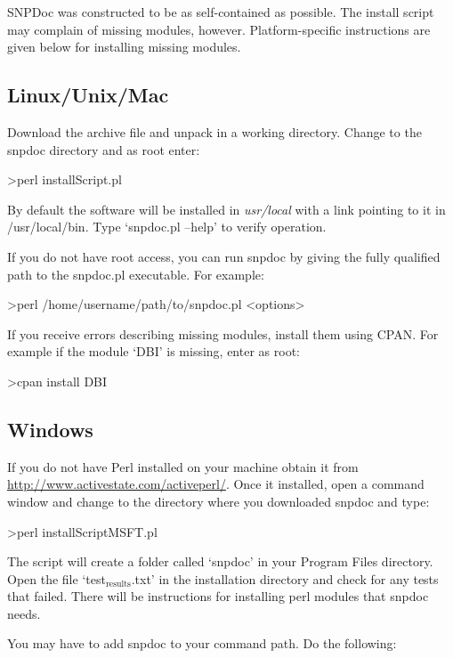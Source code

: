 \documentclass[11pt]{article}
\begin{document}
  SNPDoc was constructed to be as self-contained as possible.  The install
  script may complain of missing modules, however.  Platform-specific
  instructions are given below for installing missing modules.
\subsection{Linux/Unix/Mac}
\label{sec-2_1}


   Download the archive file and unpack in a working directory.  Change to the
   snpdoc directory and as root enter:

   >perl installScript.pl

   By default the software will be installed in \emph{usr/local} with a link pointing
   to it in /usr/local/bin.  Type `snpdoc.pl --help' to verify operation.

   If you do not have root access, you can run snpdoc by giving the fully
   qualified path to the snpdoc.pl executable.  For example:

   >perl /home/username/path/to/snpdoc.pl <options>

   If you receive errors describing missing modules, install them using CPAN.
   For example if the module `DBI' is missing, enter as root:

   >cpan install DBI
\subsection{Windows}
\label{sec-2_2}


   If you do not have Perl installed on your machine obtain it from
   \href{http://www.activestate.com/activeperl/}{http://www.activestate.com/activeperl/}.  Once it installed, open a command
   window and change to the directory where you downloaded snpdoc and type:

   >perl installScriptMSFT.pl

   The script will create a folder called `snpdoc' in your Program Files
   directory.  Open the file `test$_{\mathrm{results}}$.txt' in the installation directory
   and check for any tests that failed.  There will be instructions for
   installing perl modules that snpdoc needs.

   You may have to add snpdoc to your command path.  Do the following:
\end{document}

